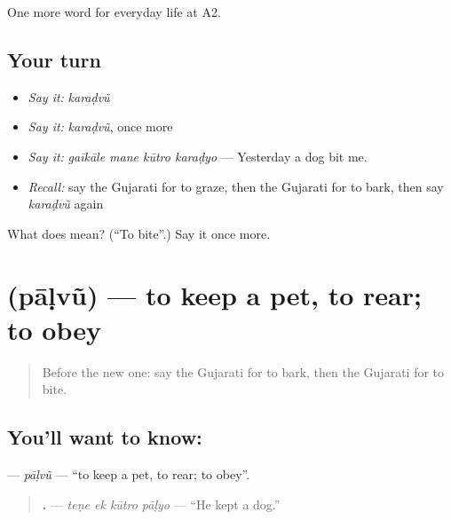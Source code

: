 \begin{grammarlens}[title={What you've built}]
One more word for everyday life at A2.
\end{grammarlens}

\subsection*{Your turn}
\begin{itemize}
\raggedright
  \item \emph{Say it:} \emph{karaḍvũ}
  \item \emph{Say it:} \emph{karaḍvũ}, once more
  \item \emph{Say it:} \emph{gaīkāle mane kūtro karaḍyo} — Yesterday a dog bit me.
  \item \emph{Recall:} say the Gujarati for to graze, then the Gujarati for to bark, then say \emph{karaḍvũ} again
\end{itemize}

\begin{tcolorbox}[breakable,colback=teal!4,colframe=teal!35!black,title={Before you move on}]
What does  mean? (\textquotedblleft{}To bite\textquotedblright{}.) Say it once more.
\end{tcolorbox}
\section[\texorpdfstring{\gu{પાળવું} (pāḷvũ)}{પાળવું (pāḷvũ)}]{ (pāḷvũ) — to keep a pet, to rear; to obey}

\label{lesson:GU-C235-palvu}



\begin{quote}
Before the new one: say the Gujarati for to bark, then the Gujarati for to bite.
\end{quote}

\subsection*{You'll want to know: }
\textbf{} — \emph{pāḷvũ} — \textquotedblleft{}to keep a pet, to rear; to obey\textquotedblright{}.

\begin{quote}
\textbf{   .} — \emph{teṇe ek kūtro pāḷyo} — \textquotedblleft{}He kept a dog.\textquotedblright{}
\end{quote}

